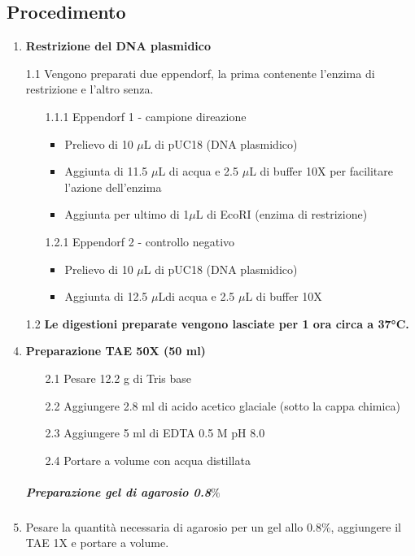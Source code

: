 \documentclass{extarticle}
\begin{document}
\subsection*{Procedimento}
\begin{enumerate}
    \item \textbf{Restrizione del DNA plasmidico}\\ 
    \item[1.1] Vengono preparati due eppendorf, la prima contenente l'enzima di restrizione e l'altro senza.
        \begin{enumerate}
            \item[1.1.1]Eppendorf 1 - campione direazione
            \begin{itemize}
                \item Prelievo di 10 $\mu$L di pUC18 (DNA plasmidico)
                \item Aggiunta di 11.5 $\mu$L di acqua e 2.5 $\mu$L di buffer 10X per facilitare l'azione dell'enzima
                \item Aggiunta per ultimo di 1$\mu$L di EcoRI (enzima di restrizione)
            \end{itemize}
            \item[1.2.1] Eppendorf 2 - controllo negativo
            \begin{itemize}
                \item Prelievo di 10 $\mu$L di pUC18 (DNA plasmidico)
                \item Aggiunta di 12.5 $\mu$Ldi acqua e 2.5 $\mu$L di buffer 10X
            \end{itemize}
        \end{enumerate}
    \item[1.2] \textbf{Le digestioni preparate vengono lasciate per 1 ora circa a 37°C.}
    \item \textbf{Preparazione TAE 50X (50 ml)}
    \begin{enumerate}
        \item[2.1] Pesare 12.2 g di Tris base
        \item[2.2] Aggiungere 2.8 ml di acido acetico glaciale (sotto la cappa chimica)
        \item[2.3] Aggiungere 5 ml di EDTA 0.5 M pH 8.0
        \item[2.4] Portare a volume con acqua distillata
    \end{enumerate}
    \subparagraph{Preparazione gel di agarosio 0.8$\%$} 
    \item Pesare la quantità necessaria di agarosio per un gel allo 0.8$\%$, aggiungere il TAE 1X e portare a volume.\\

\end{enumerate}
\end{document}
